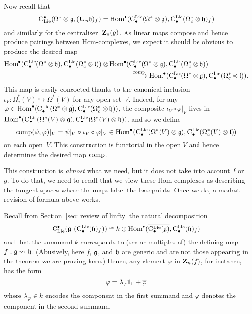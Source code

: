 \documentclass[11pt]{amsart}
\numberwithin{equation}{section}
\begin{document}
Now recall that
\[
{\rm C}_{\rm Lie}^\bullet(\Omega^* \otimes \mathfrak g, (\mathbf U_n \mathfrak h)_f) = {\rm Hom}^\bullet({\rm C}^{\rm Lie}_\bullet(\Omega^* \otimes \mathfrak g), {\rm C}^{\rm Lie}_\bullet(\Omega^*_c \otimes \mathfrak h)_f)
\]
and similarly for the centralizer~$\mathbf Z_n(g)$.
As linear maps compose and hence produce pairings between Hom-complexes,
we expect it should be obvious to produce the desired map
\begin{align*}
{\rm Hom}^\bullet({\rm C}^{\rm Lie}_\bullet(\Omega^* \otimes \mathfrak h), {\rm C}^{\rm Lie}_\bullet(\Omega^*_c \otimes \mathfrak l)) 
\otimes {\rm Hom}^\bullet(&{\rm C}^{\rm Lie}_\bullet(\Omega^* \otimes \mathfrak g), {\rm C}^{\rm Lie}_\bullet(\Omega^*_c \otimes \mathfrak h))\\
 &\xrightarrow{{\rm comp}} {\rm Hom}^\bullet({\rm C}^{\rm Lie}_\bullet(\Omega^* \otimes \mathfrak g), {\rm C}^{\rm Lie}_\bullet(\Omega^*_c \otimes \mathfrak l)).
\end{align*}
This map is easily concocted thanks to the canonical inclusion $\iota_V: \Omega^*_c(V) \hookrightarrow \Omega^*(V)$ for any open set~$V$.
Indeed, for any $\varphi \in {\rm Hom}^\bullet({\rm C}^{\rm Lie}_\bullet(\Omega^* \otimes \mathfrak g), {\rm C}^{\rm Lie}_\bullet(\Omega^*_c \otimes \mathfrak h))$,
the composite $\iota_V \circ \varphi|_V$ lives in ${\rm Hom}^\bullet({\rm C}^{\rm Lie}_\bullet(\Omega^*(V) \otimes \mathfrak g), {\rm C}^{\rm Lie}_\bullet(\Omega^*(V) \otimes \mathfrak h))$,
and so we define
\[
{\rm comp}(\psi, \varphi)|_V = \psi|_V \circ \iota_V \circ \varphi|_V \in {\rm Hom}^\bullet({\rm C}^{\rm Lie}_\bullet(\Omega^*(V) \otimes \mathfrak g), {\rm C}^{\rm Lie}_\bullet(\Omega^*_c(V) \otimes \mathfrak l))
\]
on each open~$V$.
This construction is functorial in the open $V$ and hence determines the desired map ${\rm comp}$.

This construction is {\em almost} what we need, 
but it does not take into account $f$ or $g$.
To do that, we need to recall that we view these Hom-complexes as describing the tangent spaces where the maps label the basepoints.
Once we do, a modest revision of formula above works.

Recall from Section~\ref{sec: review of linfty} the natural decomposition 
\[
{\rm C}_{\rm Lie}^\bullet(\mathfrak g,({\rm C}^{\rm Lie}_\bullet(\mathfrak h)_f)) \cong k \oplus {\rm Hom}^\bullet(\overline{{\rm C}^{\rm Lie}_\bullet(\mathfrak g)}, {\rm C}^{\rm Lie}_\bullet(\mathfrak h)_f)
\]
and that the summand $k$ corresponds to (scalar multiples of) the defining map~$f: \mathfrak g \rightsquigarrow \mathfrak h$.
(Abusively, here $f$, $\mathfrak g$, and $\mathfrak h$ are generic and are not those appearing in the theorem we are proving here.)
Hence, any element $\varphi$ in $\mathbf Z_n(f)$, for instance, has the form
\[
\varphi =\lambda_\varphi {\bf 1_f} +\overline{\varphi}
\]
where $\lambda_\varphi \in k$ encodes the component in the first summand and $\overline{\varphi}$ denotes the component in the second summand.
\end{document}

